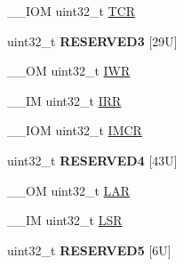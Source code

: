 \begin{DoxyCompactItemize}
\item 
\-\_\-\-\_\-\-I\-O\-M uint32\-\_\-t \hyperlink{struct_i_t_m___type_a04b9fbc83759cb818dfa161d39628426}{T\-C\-R}
\item 
\hypertarget{struct_i_t_m___type_a69ad0c7295a64174e1967c8a6d9e95b5}{uint32\-\_\-t {\bfseries R\-E\-S\-E\-R\-V\-E\-D3} \mbox{[}29\-U\mbox{]}}\label{struct_i_t_m___type_a69ad0c7295a64174e1967c8a6d9e95b5}

\item 
\-\_\-\-\_\-\-O\-M uint32\-\_\-t \hyperlink{struct_i_t_m___type_aa9da04891e48d1a2f054de186e9c4c94}{I\-W\-R}
\item 
\-\_\-\-\_\-\-I\-M uint32\-\_\-t \hyperlink{struct_i_t_m___type_a66eb82a070953f09909f39b8e516fb91}{I\-R\-R}
\item 
\-\_\-\-\_\-\-I\-O\-M uint32\-\_\-t \hyperlink{struct_i_t_m___type_ae2ce4d3a54df2fd11a197ccac4406cd0}{I\-M\-C\-R}
\item 
\hypertarget{struct_i_t_m___type_a1975f3bb58d3feba11c275f5406b34f4}{uint32\-\_\-t {\bfseries R\-E\-S\-E\-R\-V\-E\-D4} \mbox{[}43\-U\mbox{]}}\label{struct_i_t_m___type_a1975f3bb58d3feba11c275f5406b34f4}

\item 
\-\_\-\-\_\-\-O\-M uint32\-\_\-t \hyperlink{struct_i_t_m___type_a7f9c2a2113a11c7f3e98915f95b669d5}{L\-A\-R}
\item 
\-\_\-\-\_\-\-I\-M uint32\-\_\-t \hyperlink{struct_i_t_m___type_a3861c67933a24dd6632288c4ed0b80c8}{L\-S\-R}
\item 
\hypertarget{struct_i_t_m___type_a80d3c63efc2e68b754cf96d7f886ba9b}{uint32\-\_\-t {\bfseries R\-E\-S\-E\-R\-V\-E\-D5} \mbox{[}6\-U\mbox{]}}\label{struct_i_t_m___type_a80d3c63efc2e68b754cf96d7f886ba9b}


\end{DoxyCompactItemize}
